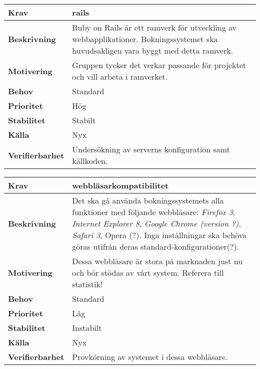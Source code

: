 \documentclass[a4paper, twoside, 11pt, titlepage]{article}
\begin{document}
		\begin{tabular} { p{2.6cm} p{12.5cm} }
			\hline
			\sffamily\textbf{Krav} & rails  \\
			\hline
			\sffamily\textbf{Beskrivning} & Ruby on Rails är ett ramverk för utveckling av webbapplikationer. Bokningssystemet ska huvudsakligen vara byggt med detta ramverk.  \\
			\hline
			\sffamily\textbf{Motivering} & Gruppen tycker det verkar passande för projektet och vill arbeta i ramverket.  \\
			\hline
			\sffamily\textbf{Behov} & Standard  \\
			\hline
			\sffamily\textbf{Prioritet} & Hög  \\
			\hline
			\sffamily\textbf{Stabilitet} & Stabilt  \\
			\hline
			\sffamily\textbf{Källa} & Nyx  \\
			\hline
			\sffamily\textbf{Verifierbarhet} & Undersökning av serverns konfiguration samt källkoden.  \\
			\hline
		\end{tabular}
		\vspace{6mm}

		\begin{tabular} { p{2.6cm} p{12.5cm} }
			\hline
			\sffamily\textbf{Krav} & webbläsarkompatibilitet  \\
			\hline
			\sffamily\textbf{Beskrivning} & Det ska gå använda bokningssystemets alla funktioner med följande webbläsare: \emph{Firefox 3}, \emph{Internet Explorer 8}, \emph{Google Chrome (version ?)}, \emph{Safari 3}, Opera (?). Inga inställningar ska behöva göras utifrån deras standard-konfigurationer(?).  \\
			\hline
			\sffamily\textbf{Motivering} & Dessa webbläsare är stora på marknaden just nu och bör stödas av vårt system. Referera till statistik!  \\
			\hline
			\sffamily\textbf{Behov} & Standard  \\
			\hline
			\sffamily\textbf{Prioritet} & Låg  \\
			\hline
			\sffamily\textbf{Stabilitet} & Instabilt  \\
			\hline
			\sffamily\textbf{Källa} & Nyx  \\
			\hline
			\sffamily\textbf{Verifierbarhet} & Provkörning av systemet i dessa webbläsare.  \\
			\hline
		\end{tabular}
		\vspace{6mm}
\end{document}
